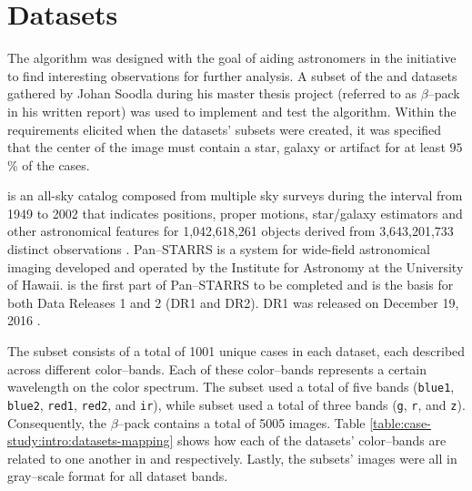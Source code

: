 \section{Datasets} \label{sect:meth:datasets}

The \mlblink algorithm was designed with the goal of aiding astronomers in the \vasco initiative to find interesting observations for further analysis. A subset of the \usno and \panstarrs datasets gathered by Johan Soodla during his master thesis project (referred to as $\beta$--pack in his written report) was used to implement and test the algorithm. Within the requirements elicited when the datasets' subsets were created, it was specified that the center of the image must contain a star, galaxy or artifact for at least $95$\% of the cases. \newline

\usno is an all-sky catalog composed from multiple sky surveys during the interval from 1949 to 2002 \cite{web:caltech:usno} that indicates positions, proper motions, star/galaxy estimators and other astronomical features for 1,042,618,261 objects derived from 3,643,201,733 distinct observations \cite{web:ap-i:usno}. Pan--STARRS is a system for wide-field astronomical imaging developed and operated by the Institute for Astronomy at the University of Hawaii. \panstarrs is the first part of Pan--STARRS to be completed and is the basis for both Data Releases 1 and 2 (DR1 and DR2). \panstarrs DR1 was released on December 19, 2016 \cite{web:stsci:panstarrs}.  \newline

The subset consists of a total of 1001 unique cases in each dataset, each described across different color--bands. Each of these color--bands represents a certain wavelength on the color spectrum. The \usno subset used a total of five bands (\texttt{blue1}, \texttt{blue2}, \texttt{red1}, \texttt{red2}, and \texttt{ir}), while \panstarrs subset used a total of three bands (\texttt{g}, \texttt{r}, and \texttt{z}). Consequently, the $\beta$--pack contains a total of 5005 images. Table \ref{table:case-study:intro:datasets-mapping} shows how each of the datasets' color--bands are related to one another in \usno and \panstarrs respectively. Lastly, the subsets' images were all in gray--scale format for all dataset bands. 

